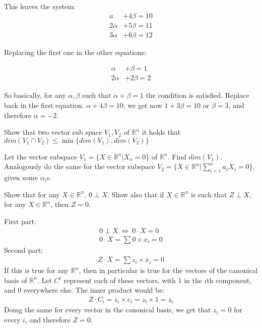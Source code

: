 \documentclass[answers]{exam}
\begin{document}
\begin{questions}
\begin{solution}
    This leaves the system:
    \begin{align*}
        a&+4\beta = 10\\
        2\alpha &+ 5\beta = 11\\
        3\alpha &+ 6\beta = 12
    \end{align*}
    
    Replacing the first one in the other equations:
    
    \begin{align*}
        \alpha&+\beta = 1\\
        2\alpha &+ 2\beta = 2
    \end{align*}

    So basically, for any $\alpha,\beta$ such that $\alpha+\beta=1$ the condition is satisfied. Replace back in the first equation. $\alpha+4\beta=10$, we get now $1+3\beta=10$ or $\beta=3$, and therefore $\alpha = -2$.

\end{solution}

\question Show that two vector sub space $V_1, V_2$ of $\mathbb{R}^n$ it holds that $dim(V_1\cap V_2)\leq \min\{dim(V_1),dim(V_2)\}$

\question Let the vector subspace $V_1=\{X\in\mathbb{R}^n|X_n=0\}$ of $\mathbb{R}^n$. Find $dim(V_1)$. Analogously do the same for the vector subspace $V_2=\{X\in\mathbb{R}^n|\sum_{i=1}^n a_iX_i=0\}$, given some $\alpha_i$s.

\question Show that for any $X\in\mathbb{R}^n$, $0\perp X$. Show also that if $X\in\mathbb{R}^n$ is such that $Z\perp X$, for any $X\in\mathbb{R}^n$, then $Z=0$.
\begin{solution}

    First part:
    \begin{align*}
        0\perp X\ \Leftrightarrow\ 0\cdot X = 0 \\
        0\cdot X = \sum 0\times x_i = 0
    \end{align*}
    Second part:
    \begin{align*}
        Z\cdot X= \sum z_i\times x_i = 0
    \end{align*}
    If this is true for any $\mathbb{R}^n$, then in particular is true for the vectors of the canonical basis of $\mathbb{R}^n$. Let $C^i$ represent each of these vectors, with 1 in the $i$th component, and 0 everywhere else. The inner product would be:
    \begin{align*}
        Z\cdot C_i = z_i\times c_i =z_i\times 1= z_i
    \end{align*}
    Doing the same for every vector in the canonical basis, we get that $z_i=0$ for every $i$, and therefore $Z=0$.
\end{solution}


\end{questions}
\end{document}
